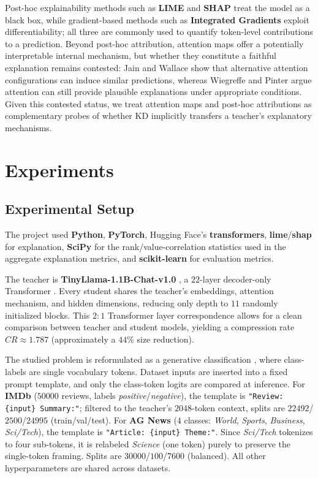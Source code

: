 \documentclass[conference]{IEEEtran}
\begin{document}
Post-hoc explainability methods such as \textbf{LIME} \cite{ribeiro2016should} and \textbf{SHAP} \cite{lundberg2017unified} treat the model as a black box, while gradient-based methods such as \textbf{Integrated Gradients} \cite{sundararajan2017axiomatic} exploit differentiability; all three are commonly used to quantify token-level contributions to a prediction. Beyond post-hoc attribution, attention maps offer a potentially interpretable internal mechanism, but whether they constitute a faithful explanation remains contested: Jain and Wallace \cite{jain2019attention} show that alternative attention configurations can induce similar predictions, whereas Wiegreffe and Pinter \cite{wiegreffe2019attention} argue attention can still provide plausible explanations under appropriate conditions. Given this contested status, we treat attention maps and post-hoc attributions as complementary probes of whether KD implicitly transfers a teacher's explanatory mechanisms.

\section{Experiments}

\subsection{Experimental Setup}\label{sec:setup}

The project used \textbf{Python}, \textbf{PyTorch}, Hugging Face's \textbf{transformers}, \textbf{lime}/\textbf{shap} for explanation, \textbf{SciPy} for the rank/value-correlation statistics used in the aggregate explanation metrics, and \textbf{scikit-learn} for evaluation metrics.

The teacher is \textbf{TinyLlama-1.1B-Chat-v1.0} \cite{zhang2024tinyllama}, a $22$-layer decoder-only Transformer \cite{vaswani2017attention}. Every student shares the teacher's embeddings, attention mechanism, and hidden dimensions, reducing only depth to $11$ randomly initialized blocks. This $2{:}1$ Transformer layer correspondence allows for a clean comparison between teacher and student models, yielding a compression rate $CR\approx1.787$ (approximately a $44\%$ size reduction).

The studied problem is reformulated as a generative classification \cite{schick2021exploiting}, where class-labels are single vocabulary tokens. Dataset inputs are inserted into a fixed prompt template, and only the class-token logits are compared at inference. For \textbf{IMDb} \cite{maas2011learning} ($50000$ reviews, labels \textit{positive}/\textit{negative}), the template is \texttt{"Review: \{input\} Summary:"}; filtered to the teacher's $2048$-token context, splits are $22492$/$2500$/$24995$ (train/val/test). For \textbf{AG News} \cite{zhang2015character} ($4$ classes: \textit{World}, \textit{Sports}, \textit{Business}, \textit{Sci/Tech}), the template is \texttt{"Article: \{input\} Theme:"}. Since \textit{Sci/Tech} tokenizes to four sub-tokens, it is relabeled \textit{Science} (one token) purely to preserve the single-token framing. Splits are $30000$/$100$/$7600$ (balanced). All other hyperparameters are shared across datasets.
\end{document}

